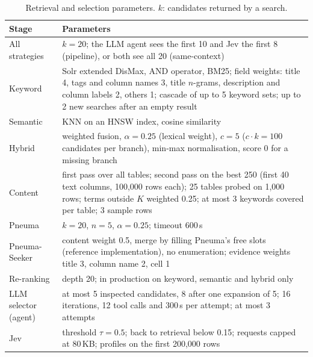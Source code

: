 \begin{table}[t]
\caption{Retrieval and selection parameters. $k$: candidates returned by a
search.}
\label{tab:retrieval-parameters}
\centering
\small
\begin{tabular}{lp{8.4cm}}
\hline
Stage & Parameters \\
\hline
All strategies & $k=20$; the LLM agent sees the first 10 and Jev the first 8 (pipeline), or both see all 20 (same-context) \\
Keyword & Solr extended DisMax, AND operator, BM25; field weights: title 4, tags and column names 3, title $n$-grams, description and column labels 2, others 1; cascade of up to 5 keyword sets; up to 2 new searches after an empty result \\
Semantic & KNN on an HNSW index, cosine similarity \\
Hybrid & weighted fusion, $\alpha=0.25$ (lexical weight), $c=5$ ($c \cdot k = 100$ candidates per branch), min-max normalisation, score 0 for a missing branch \\
Content & first pass over all tables; second pass on the best 250 (first 40 text columns, 100{,}000 rows each); 25 tables probed on 1{,}000 rows; terms outside $K$ weighted 0.25; at most 3 keywords covered per table; 3 sample rows \\
Pneuma & $k=20$, $n=5$, $\alpha=0.25$; timeout 600\,s \\
Pneuma-Seeker & content weight 0.5, merge by filling Pneuma's free slots (reference implementation), no enumeration; evidence weights title 3, column name 2, cell 1 \\
Re-ranking & depth 20; in production on keyword, semantic and hybrid only \\
LLM selector (agent) & at most 5 inspected candidates, 8 after one expansion of 5; 16 iterations, 12 tool calls and 300\,s per attempt; at most 3 attempts \\
Jev & threshold $\tau=0.5$; back to retrieval below 0.15; requests capped at 80\,KB; profiles on the first 200{,}000 rows \\
\hline
\end{tabular}
\end{table}


